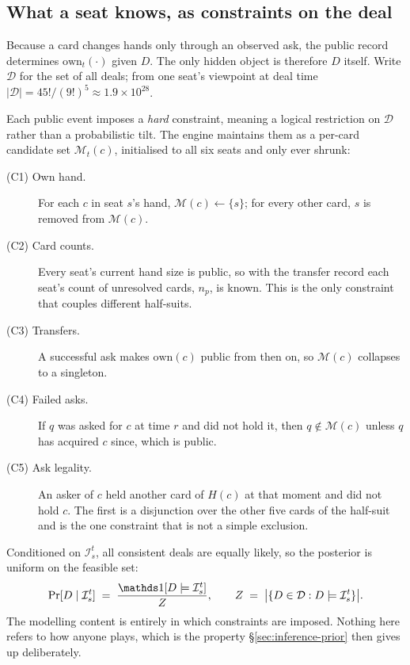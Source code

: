 \subsection{What a seat knows, as constraints on the deal}
\label{sec:inference-constraints}

Because a card changes hands only through an observed ask, the public record determines
$\mathrm{own}_t(\cdot)$ given $D$. The only hidden object is therefore $D$ itself. Write
$\mathcal{D}$ for the set of all deals; from one seat's viewpoint at deal time
$|\mathcal{D}| = 45!/(9!)^5 \approx 1.9 \times 10^{28}$.

Each public event imposes a \emph{hard} constraint, meaning a logical restriction on $\mathcal{D}$
rather than a probabilistic tilt. The engine maintains them as a per-card candidate set
$\mathcal{M}_t(c)$, initialised to all six seats and only ever shrunk:

\begin{description}
\item[(C1) Own hand.] For each $c$ in seat $s$'s hand, $\mathcal{M}(c) \leftarrow \{s\}$; for every
  other card, $s$ is removed from $\mathcal{M}(c)$.
\item[(C2) Card counts.] Every seat's current hand size is public, so with the transfer record each
  seat's count of unresolved cards, $n_p$, is known. This is the only constraint that couples
  different half-suits.
\item[(C3) Transfers.] A successful ask makes $\mathrm{own}(c)$ public from then on, so
  $\mathcal{M}(c)$ collapses to a singleton.
\item[(C4) Failed asks.] If $q$ was asked for $c$ at time $r$ and did not hold it, then $q \notin
  \mathcal{M}(c)$ unless $q$ has acquired $c$ since, which is public.
\item[(C5) Ask legality.] An asker of $c$ held another card of $H(c)$ at that moment and did not hold
  $c$. The first is a disjunction over the other five cards of the half-suit and is the one
  constraint that is not a simple exclusion.
\end{description}

Conditioned on $\mathcal{I}_s^t$, all consistent deals are equally likely, so the posterior is
uniform on the feasible set:
\begin{equation}
  \Pr[D \mid \mathcal{I}_s^t] \;=\; \frac{\ind\!\left[D \models \mathcal{I}_s^t\right]}{Z},
  \qquad
  Z \;=\; \bigl|\{D \in \mathcal{D} : D \models \mathcal{I}_s^t\}\bigr|.
  \label{eq:posterior}
\end{equation}
The modelling content is entirely in which constraints are imposed. Nothing here refers to how anyone
plays, which is the property \S\ref{sec:inference-prior} then gives up deliberately.

